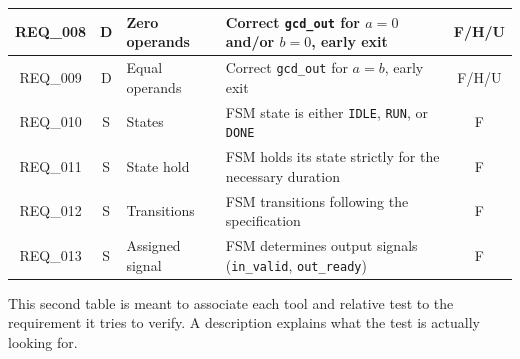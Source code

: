 \begin{table}[H]
\begin{tabularx}{\textwidth}{|c|c|l|X|c|}
        REQ\_008        & D                 & Zero operands         & Correct \texttt{gcd\_out} for $a=0$ and/or $b=0$, early exit                              & F/H/U         \\ \midrule
        REQ\_009        & D                 & Equal operands        & Correct \texttt{gcd\_out} for $a=b$, early exit                                           & F/H/U         \\ \bottomrule \toprule
        REQ\_010        & S                 & States                & FSM state is either \texttt{IDLE}, \texttt{RUN}, or \texttt{DONE}                         & F             \\ \midrule
        REQ\_011        & S                 & State hold            & FSM holds its state strictly for the necessary duration                                   & F             \\ \midrule
        REQ\_012        & S                 & Transitions           & FSM transitions following the specification                                               & F             \\ \midrule
        REQ\_013        & S                 & Assigned signal       & FSM determines output signals (\texttt{in\_valid}, \texttt{out\_ready})                   & F             \\ \bottomrule
    \end{tabularx}
\end{table}
This second table is meant to associate each tool and relative test to the requirement it tries to verify.
A description explains what the test is actually looking for.
